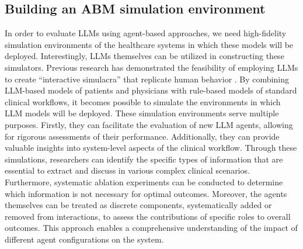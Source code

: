 \documentclass[10pt]{article}
\begin{document}
\begin{multicols}{2}
\section{Building an ABM simulation environment}
In order to evaluate LLMs using agent-based approaches, we need high-fidelity simulation environments of the healthcare systems in which these models will be deployed. Interestingly, LLMs themselves can be utilized in constructing these simulators. Previous research has demonstrated the feasibility of employing LLMs to create “interactive simulacra” that replicate human behavior \cite{park2023generative, yang2023auto}. By combining LLM-based models of patients and physicians with rule-based models of standard clinical workflows, it becomes possible to simulate the environments in which LLM models will be deployed. These simulation environments serve multiple purposes. Firstly, they can facilitate the evaluation of new LLM agents, allowing for rigorous assessments of their performance. Additionally, they can provide valuable insights into system-level aspects of the clinical workflow. Through these simulations, researchers can identify the specific types of information that are essential to extract and discuss in various complex clinical scenarios. Furthermore, systematic ablation experiments can be conducted to determine which information is not necessary for optimal outcomes. Moreover, the agents themselves can be treated as discrete components, systematically added or removed from interactions, to assess the contributions of specific roles to overall outcomes. This approach enables a comprehensive understanding of the impact of different agent configurations on the system.  


\end{multicols}
\end{document}
